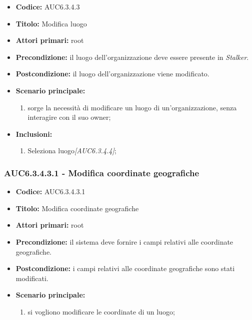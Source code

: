 \documentclass[casi-duso]{subfiles}
\begin{document}
\begin{itemize}
  \item \textbf{Codice:} AUC6.3.4.3
  \item \textbf{Titolo:} Modifica luogo
  \item \textbf{Attori primari:} root
  \item \textbf{Precondizione:} il luogo dell'organizzazione deve essere presente in \emph{Stalker}.
  \item \textbf{Postcondizione:} il luogo dell'organizzazione viene modificato.
  \item \textbf{Scenario principale:}
  \begin{enumerate}
    \item sorge la necessità di modificare un luogo di un'organizzazione, senza interagire con il suo owner;
  \end{enumerate}
  \item \textbf{Inclusioni:}
  \begin{enumerate}
    \item Seleziona luogo\emph{[AUC6.3.4.4]};
  \end{enumerate}
\end{itemize}

\subsubsection{AUC6.3.4.3.1 - Modifica coordinate geografiche}%
\label{subsub:AUC6.3.4.3.1}
\begin{itemize}
  \item \textbf{Codice:} AUC6.3.4.3.1
  \item \textbf{Titolo:} Modifica coordinate geografiche
  \item \textbf{Attori primari:} root
  \item \textbf{Precondizione:} il sistema deve fornire i campi relativi alle coordinate geografiche.
  \item \textbf{Postcondizione:} i campi relativi alle coordinate geografiche sono stati modificati.
  \item \textbf{Scenario principale:}
  \begin{enumerate}
    \item si vogliono modificare le coordinate di un luogo;
  \end{enumerate}
\end{itemize}
\end{document}
